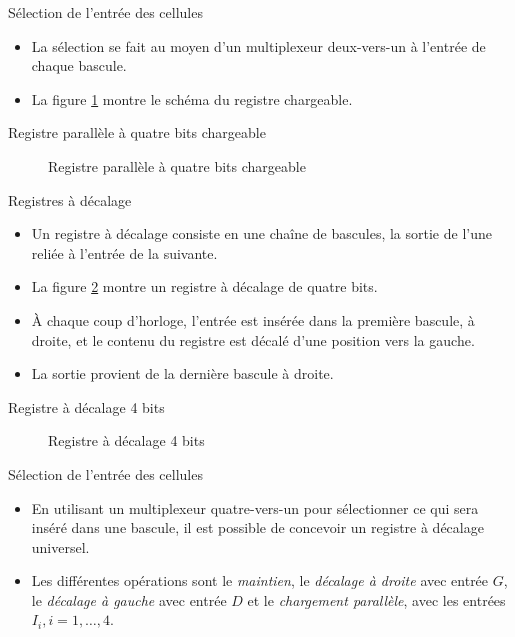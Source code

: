 \documentclass[presentation]{beamer}
\begin{document}
\begin{frame}[label={sec:org82b8608}]{Sélection de l'entrée des cellules}
\begin{itemize}
\item La sélection se fait au moyen d'un multiplexeur deux-vers-un à l'entrée de chaque bascule.

\item La figure \ref{fig:orgb3ff592} montre le schéma du registre chargeable.
\end{itemize}
\end{frame}

\begin{frame}[label={sec:orgdc6fe39}]{Registre parallèle à quatre bits chargeable}
\begin{figure}[htbp]
\centering

\caption{\label{fig:orgb3ff592}Registre parallèle à quatre bits chargeable}
\end{figure}
\end{frame}

\begin{frame}[label={sec:org47ad888}]{Registres à décalage}
\begin{itemize}
\item Un registre à décalage consiste en une chaîne de bascules, la sortie de l'une reliée à l'entrée de la suivante.

\item La figure \ref{fig:orgad0d918} montre un registre à décalage de quatre bits.

\item À chaque coup d'horloge, l'entrée est insérée dans la première bascule, à droite, et le contenu du registre est décalé d'une position vers la gauche.

\item La sortie provient de la dernière bascule à droite.
\end{itemize}
\end{frame}

\begin{frame}[label={sec:orgb818eed}]{Registre à décalage 4 bits}
\begin{figure}[htbp]
\centering

\caption{\label{fig:orgad0d918}Registre à décalage 4 bits}
\end{figure}
\end{frame}

\begin{frame}[label={sec:orga5d05be}]{Sélection de l'entrée des cellules}
\begin{itemize}
\item En utilisant un multiplexeur quatre-vers-un pour sélectionner ce qui sera inséré dans une bascule, il est possible de concevoir un registre à décalage universel.

\item Les différentes opérations sont le \emph{maintien}, le \emph{décalage à droite} avec entrée \(G\), le \emph{décalage à gauche} avec entrée \(D\) et le \emph{chargement parallèle}, avec les entrées \(I_i, i=1, \ldots, 4\).
\end{itemize}
\end{frame}
\end{document}
